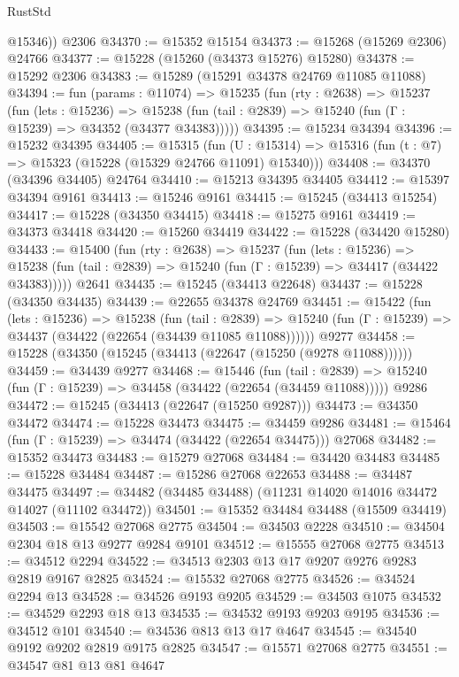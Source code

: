 \begin{lexlean}{RustStd}
\begin{coremodule}
        @15346))
    @2306
@34370 := @15352 @15154
@34373 := @15268 (@15269 @2306) @24766
@34377 := @15228 (@15260 (@34373 @15276) @15280)
@34378 := @15292 @2306
@34383 := @15289 (@15291 @34378 @24769 @11085 @11088)
@34394 := fun (params : @11074) =>
  @15235
    (fun (rty : @2638) =>
    @15237
      (fun (lets : @15236) =>
      @15238 (fun (tail : @2839) => @15240 (fun (Γ : @15239) => @34352 (@34377 @34383)))))
@34395 := @15234 @34394
@34396 := @15232 @34395
@34405 := @15315
    (fun (U : @15314) => @15316 (fun (t : @7) => @15323 (@15228 (@15329 @24766 @11091) @15340)))
@34408 := @34370 (@34396 @34405) @24764
@34410 := @15213 @34395 @34405
@34412 := @15397 @34394 @9161
@34413 := @15246 @9161
@34415 := @15245 (@34413 @15254)
@34417 := @15228 (@34350 @34415)
@34418 := @15275 @9161
@34419 := @34373 @34418
@34420 := @15260 @34419
@34422 := @15228 (@34420 @15280)
@34433 := @15400
    (fun (rty : @2638) =>
    @15237
      (fun (lets : @15236) =>
      @15238 (fun (tail : @2839) => @15240 (fun (Γ : @15239) => @34417 (@34422 @34383)))))
    @2641
@34435 := @15245 (@34413 @22648)
@34437 := @15228 (@34350 @34435)
@34439 := @22655 @34378 @24769
@34451 := @15422
    (fun (lets : @15236) =>
    @15238
      (fun (tail : @2839) =>
      @15240 (fun (Γ : @15239) => @34437 (@34422 (@22654 (@34439 @11085 @11088))))))
    @9277
@34458 := @15228 (@34350 (@15245 (@34413 (@22647 (@15250 (@9278 @11088))))))
@34459 := @34439 @9277
@34468 := @15446
    (fun (tail : @2839) => @15240 (fun (Γ : @15239) => @34458 (@34422 (@22654 (@34459 @11088)))))
    @9286
@34472 := @15245 (@34413 (@22647 (@15250 @9287)))
@34473 := @34350 @34472
@34474 := @15228 @34473
@34475 := @34459 @9286
@34481 := @15464 (fun (Γ : @15239) => @34474 (@34422 (@22654 @34475))) @27068
@34482 := @15352 @34473
@34483 := @15279 @27068
@34484 := @34420 @34483
@34485 := @15228 @34484
@34487 := @15286 @27068 @22653
@34488 := @34487 @34475
@34497 := @34482 (@34485 @34488) (@11231 @14020 @14016 @34472 @14027 (@11102 @34472))
@34501 := @15352 @34484 @34488 (@15509 @34419)
@34503 := @15542 @27068 @2775
@34504 := @34503 @2228
@34510 := @34504 @2304 @18 @13 @9277 @9284 @9101
@34512 := @15555 @27068 @2775
@34513 := @34512 @2294
@34522 := @34513 @2303 @13 @17 @9207 @9276 @9283 @2819 @9167 @2825
@34524 := @15532 @27068 @2775
@34526 := @34524 @2294 @13
@34528 := @34526 @9193 @9205
@34529 := @34503 @1075
@34532 := @34529 @2293 @18 @13
@34535 := @34532 @9193 @9203 @9195
@34536 := @34512 @101
@34540 := @34536 @813 @13 @17 @4647
@34545 := @34540 @9192 @9202 @2819 @9175 @2825
@34547 := @15571 @27068 @2775
@34551 := @34547 @81 @13 @81 @4647

\end{coremodule}
\end{lexlean}
